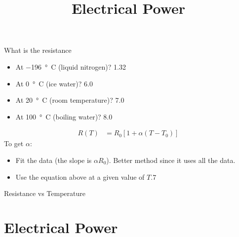 \documentclass[aspectratio=169,
hyperref={colorlinks,urlcolor=blue}
]{beamer}
\begin{document}



{
What is the resistance
\begin{itemize}
\item At \SI{-196}{\degree C} (liquid nitrogen)? \SI{1.32}{\Omega}
\item At \SI{0}{\degree C} (ice water)? \SI{6.0}{\Omega}
\item At \SI{20}{\degree C} (room temperature)? \SI{7.0}{\Omega}
\item At \SI{100}{\degree C} (boiling water)? \SI{8.0}{\Omega}
\end{itemize}
\begin{align*}
 R(T) &= R_0 \left[1+\alpha(T-T_0)\right]
\end{align*}
To get $\alpha$:
\begin{itemize}
\item Fit the data (the slope is $\alpha R_0$). Better method since it uses all the data.
\item Use the equation above at a given value of $T$.7
\end{itemize}
}
{

}






\begin{frame}{Resistance vs Temperature}


\end{frame}









\section{Electrical Power}
\label{sec:electricalpower}
\title{Electrical Power}


\begin{frame}
\titlepage
\thispagestyle{empty}
\end{frame}
\end{document}
